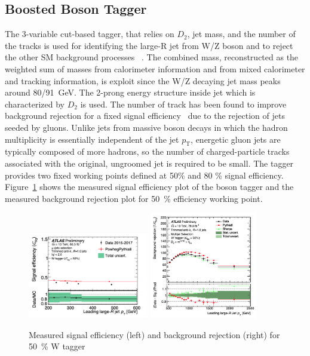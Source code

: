\subsection{Boosted Boson Tagger}
The 3-variable cut-based tagger, that relies on $D_2$, jet mass, and the number of the tracks is used for identifying the large-R jet from W/Z boson and to reject the other SM background processes~\cite{ATL-PHYS-PUB-2020-017} . 
The combined mass, reconstructed as the weighted sum of masses from calorimeter information and from mixed calorimeter and tracking information, is exploit since the W/Z decaying jet mass peaks around 80/91~GeV. 
The 2-prong energy structure inside jet which is characterized by $D_2$ is used.
The number of track has been found to improve background rejection for a fixed signal efficiency~\cite{EXOT-2013-08} due to the rejection of jets seeded by gluons.  
Unlike jets from massive boson decays in which the hadron multiplicity is essentially independent of the jet $p_\mathrm{T}$, energetic gluon jets are typically composed of more hadrons, so the number of charged-particle tracks associated with the original, ungroomed jet is required to be small. 
The tagger provides two fixed working points defined at 50\% and 80 \% signal efficiency. 
Figure~\ref{fig:bosonTagger} shows the measured signal efficiency plot of the boson tagger and the measured background rejection plot for 50~\% efficiency working point.
\begin{figure}[tbp]
    \begin{center}
    \includegraphics[width=0.47\textwidth,keepaspectratio]{figures/Reconstruction/bosontaggersignaleff}
    \includegraphics[width=0.42\textwidth,keepaspectratio]{figures/Reconstruction/bosontaggerrejection}
    \caption{
     Measured signal efficiency (left) and background rejection (right) for 50~\% W tagger \cite{ATL-PHYS-PUB-2020-017}
    }
    \label{fig:bosonTagger}
    \end{center}
\end{figure}

